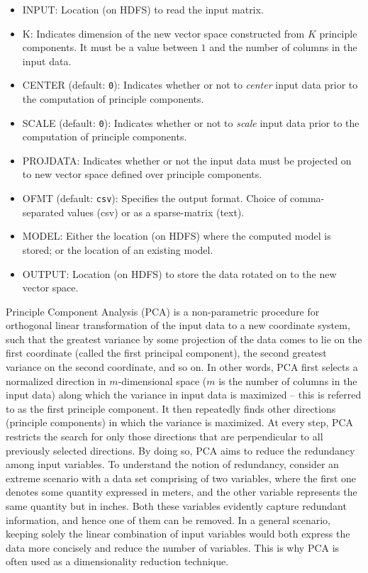 
\begin{itemize}
\item INPUT: Location (on HDFS) to read the input matrix.
\item K: Indicates dimension of the new vector space constructed from $K$ principle components. It must be a value between $1$ and the number of columns in the input data.
\item CENTER (default: {\tt 0}): Indicates whether or not to {\em center} input data prior to the computation of principle components.
\item SCALE (default: {\tt 0}): Indicates whether or not to {\em scale} input data prior to the computation of principle components.
\item PROJDATA: Indicates whether or not the input data must be projected on to new vector space defined over principle components.
\item OFMT (default: {\tt csv}): Specifies the output format. Choice of comma-separated values (csv) or as a sparse-matrix (text).
\item MODEL: Either the location (on HDFS) where the computed model is stored; or the location of an existing model.
\item OUTPUT: Location (on HDFS) to store the data rotated on to the new vector space.
\end{itemize}


Principle Component Analysis (PCA) is a non-parametric procedure for orthogonal linear transformation of the input data to a new coordinate system, such that the greatest variance by some projection of the data comes to lie on the first coordinate (called the first principal component), the second greatest variance on the second coordinate, and so on. In other words, PCA first selects a normalized direction in $m$-dimensional space ($m$ is the number of columns in the input data) along which the variance in input data is maximized -- this is referred to as the first principle component. It then repeatedly finds other directions (principle components) in which the variance is maximized. At every step, PCA restricts the search for only those directions that are perpendicular to all previously selected directions. By doing so, PCA aims to reduce the redundancy among input variables. To understand the notion of redundancy, consider an extreme scenario with a data set comprising of two variables, where the first one denotes some quantity expressed in meters, and the other variable represents the same quantity but in inches. Both these variables evidently capture redundant information, and hence one of them can be removed. In a general scenario, keeping solely the linear combination of input variables would both express the data more concisely and reduce the number of variables. This is why PCA is often used as a dimensionality reduction technique.


